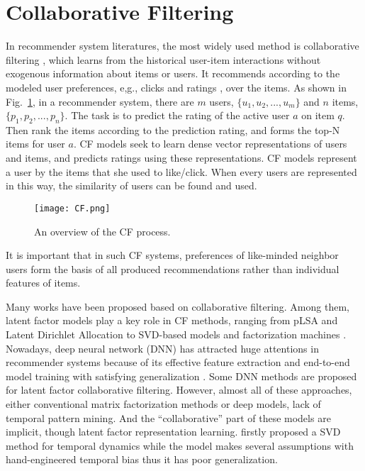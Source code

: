 \section{Collaborative Filtering}
In recommender system literatures, the most widely used method is 
collaborative filtering \cite{goldberg1992using}, which learns from 
the historical user-item interactions without exogenous information 
about items or users. It recommends according to the modeled user 
preferences, e,g., clicks \cite{qu2016product,agarwal2009spatio} and 
ratings \cite{koren2009collaborative}, over the items.
As shown in Fig.~\ref{fig:cf}, in a recommender system, there are $m$ users, 
$\{u_1, u_2, ..., u_m\}$ and $n$ items, $\{p_1, p_2, ..., p_n\}$. The task is
to predict the rating of the active user $a$ on item $q$. Then rank the items 
according to the prediction rating, and forms the top-N items for user $a$.
CF models seek to learn dense vector representations of users and items, 
and predicts ratings using these representations. CF models represent a 
user by the items that she used to like/click. When every users are 
represented in this way, the similarity of users can be found and used.
\begin{figure}[h]
	\centering
	\texttt{[image: CF.png]}
	\caption{An overview of the CF process.}
	\label{fig:cf}
	\vspace{-10pt}
\end{figure}
It is important that in such CF systems, preferences of like-minded neighbor 
users form the basis of all produced recommendations rather than individual 
features of items.

Many works \cite{koren2009matrix,salakhutdinov2007probabilistic,yang2012local,zhang2013optimizing} have been proposed based on collaborative filtering.
Among them, latent factor models play a key role in CF methods, ranging from pLSA \cite{hofmann2004latent} and Latent Dirichlet Allocation \cite{blei2003latent} to SVD-based models \cite{koren2008factorization,chen2012svdfeature} and factorization machines \cite{rendle2010factorization}.
Nowadays, deep neural network (DNN) has attracted huge attentions in recommender systems because of its effective feature extraction and end-to-end model training with satisfying generalization \cite{zhang2017deep}.
Some DNN methods \cite{he2017neural,he2018outer,qu2016product} are proposed for latent factor collaborative filtering.
However, almost all of these approaches, either conventional matrix factorization methods or deep models, lack of temporal pattern mining. And the ``collaborative'' part of these models are implicit, though latent factor representation learning.
\cite{koren2009collaborative} firstly proposed a SVD method for temporal dynamics while the model makes several assumptions with hand-engineered temporal bias thus it has poor generalization.

